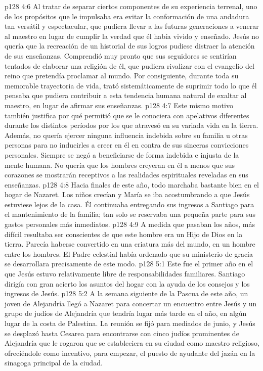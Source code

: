 \vs p128 4:6 Al tratar de separar ciertos componentes de su experiencia terrenal, uno de los propósitos que le impulsaba era evitar la conformación de una andadura tan versátil y espectacular, que pudiera llevar a las futuras generaciones a venerar al maestro en lugar de cumplir la verdad que él había vivido y enseñado. Jesús no quería que la recreación de un historial de sus logros pudiese distraer la atención de sus enseñanzas. Comprendió muy pronto que sus seguidores se sentirían tentados de elaborar una religión  de él, que pudiera rivalizar con el evangelio del reino que pretendía proclamar al mundo. Por consiguiente, durante toda su memorable trayectoria de vida, trató sistemáticamente de suprimir todo lo que él pensaba que pudiera contribuir a esta tendencia humana natural de exaltar al maestro, en lugar de afirmar sus enseñanzas.
\vs p128 4:7 Este mismo motivo también justifica por qué permitió que se le conociera con apelativos diferentes durante los distintos períodos por los que atravesó en su variada vida en la tierra. Además, no quería ejercer ninguna influencia indebida sobre su familia u otras personas para no inducirles a creer en él en contra de sus sinceras convicciones personales. Siempre se negó a beneficiarse de forma indebida e injusta de la mente humana. No quería que los hombres creyeran en él a menos que sus corazones se mostrarán receptivos a las realidades espirituales reveladas en sus enseñanzas.
\vs p128 4:8 \pc Hacia finales de este año, todo marchaba bastante bien en el hogar de Nazaret. Los niños crecían y María se iba acostumbrando a que Jesús estuviese lejos de la casa. Él continuaba entregando sus ingresos a Santiago para el mantenimiento de la familia; tan solo se reservaba una pequeña parte para sus gastos personales más inmediatos.
\vs p128 4:9 A medida que pasaban los años, más difícil resultaba ser conscientes de que este hombre era un Hijo de Dios en la tierra. Parecía haberse convertido en una criatura más del mundo, en un hombre entre los hombres. El Padre celestial había ordenado que su ministerio de gracia se desarrollara precisamente de este modo.
\vs p128 5:1 Este fue el primer año en el que Jesús estuvo relativamente libre de responsabilidades familiares. Santiago dirigía con gran acierto los asuntos del hogar con la ayuda de los consejos y los ingresos de Jesús.
\vs p128 5:2 \pc A la semana siguiente de la Pascua de este año, un joven de Alejandría llegó a Nazaret para concertar un encuentro entre Jesús y un grupo de judíos de Alejandría que tendría lugar más tarde en el año, en algún lugar de la costa de Palestina. La reunión se fijó para mediados de junio, y Jesús se desplazó hasta Cesarea para encontrarse con cinco judíos prominentes de Alejandría que le rogaron que se estableciera en su ciudad como maestro religioso, ofreciéndole como incentivo, para empezar, el puesto de ayudante del jazán en la sinagoga principal de la ciudad.
